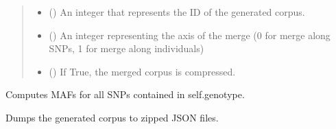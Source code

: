 \documentclass[a4paper,10pt,english]{sphinxhowto}
\begin{document}
\begin{fulllineitems}
\begin{fulllineitems}
\begin{quote}
\begin{description}
\begin{itemize}
\item {} 
 () \textendash{} An integer that represents the ID of the generated corpus.

\item {} 
 () \textendash{} An integer representing the axis of the merge (0 for merge along SNPs, 1 for merge along individuals)

\item {} 
 () \textendash{} If True, the merged corpus is compressed.

\end{itemize}

\end{description}\end{quote}

\end{fulllineitems}


\begin{fulllineitems}
\label{\detokenize{utils:utils.genotype_corpus_merger.GenotypeCorpusMerger.compute_mafs}}
Computes MAFs for all SNPs contained in self.genotype.

\end{fulllineitems}


\begin{fulllineitems}
\label{\detokenize{utils:utils.genotype_corpus_merger.GenotypeCorpusMerger.dump_corpus}}
Dumps the generated corpus to zipped JSON files.

\end{fulllineitems}


\begin{fulllineitems}
\label{\detokenize{utils:utils.genotype_corpus_merger.GenotypeCorpusMerger.merge_corpora}}
\end{fulllineitems}


\end{fulllineitems}
\end{document}
